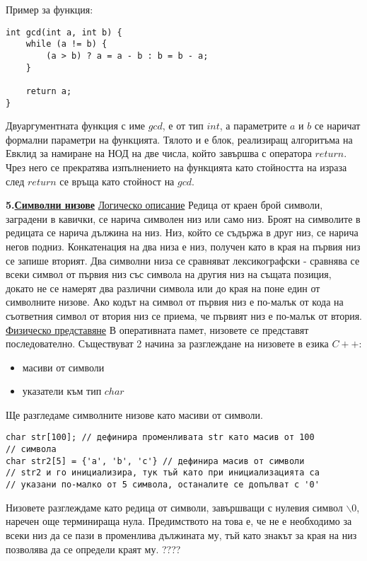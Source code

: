 \documentclass{article}
\begin{document}
Пример за функция:
\begin{lstlisting}
int gcd(int a, int b) {
    while (a != b) {
        (a > b) ? a = a - b : b = b - a; 
    }
    
    return a;
}
\end{lstlisting}
Двуаргументната функция с име $gcd$, е от тип $int$, а параметрите $a$ и $b$ се наричат формални параметри на функцията. Тялото
и е блок, реализиращ алгоритъма на Евклид за намиране на НОД на две числа, който завършва с оператора $return$. Чрез него се
прекратява изпълнението на функцията като стойността на израза след $return$ се връща като стойност на $gcd$.

\textbf{5.\underline{Символни низове}} \newline\newline
\underline{Логическо описание} \newline
Редица от краен брой символи, заградени в кавички, се нарича символен низ или само низ. Броят на символите в редицата се нарича
дължина на низ. Низ, който се съдържа в друг низ, се нарича негов подниз. Конкатенация на два низа е низ, получен като в края на
първия низ се запише вторият. Два символни низа се сравняват лексикографски - сравнява се всеки символ от първия низ със символа
на другия низ на същата позиция, докато не се намерят два различни символа или до края на поне един от символните низове. Ако
кодът на символ от първия низ е по-малък от кода на съответния символ от втория низ се приема, че първият низ е по-малък от втория. \newline\newline
\underline{Физическо представяне} \newline
В оперативната памет, низовете се представят последователно. Съществуват 2 начина за разглеждане на низовете в езика $C++$:
\begin{itemize}
    \item масиви от символи
    \item указатели към тип $char$
\end{itemize}
Ще разгледаме символните низове като масиви от символи.
\begin{lstlisting}
char str[100]; // дефинира променливата str като масив от 100
// символа
char str2[5] = {'a', 'b', 'c'} // дефинира масив от символи
// str2 и го инициализира, тук тъй като при инициализацията са
// указани по-малко от 5 символа, останалите се допълват с '0'
\end{lstlisting}
Низовете разглеждаме като редица от символи, завършващи с нулевия символ $\backslash0$, наречен още терминираща нула. Предимството
на това е, че не е необходимо за всеки низ да се пази в променлива дължината му, тъй като знакът за края на низ позволява да се
определи краят му. ????
\end{document}

